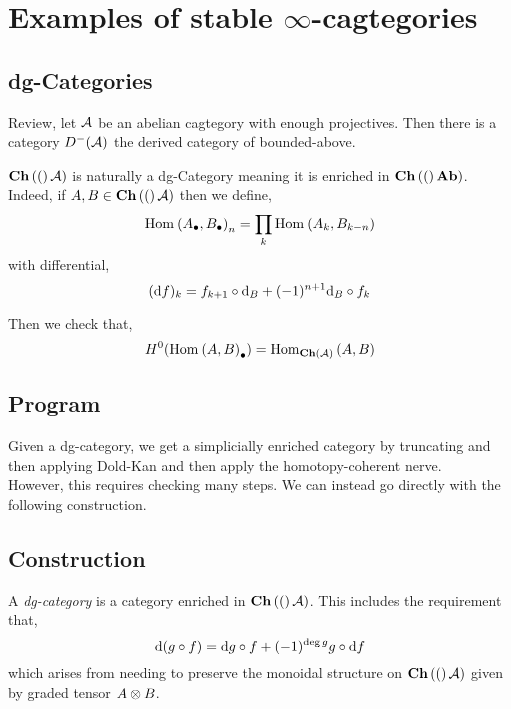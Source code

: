 \documentclass[12pt]{article}
\begin{document}
\section{Examples of stable $\infty$-cagtegories}

\subsection{dg-Categories}

\newcommand{\DK}{\mathrm{DK}}
\newcommand{\fin}{\mathrm{fin}}
\newcommand{\Fun}[3]{\mathrm{Fun}_{#1}\left(#2, #3\right)}
\newcommand{\Map}[3]{\mathrm{Map}_{#1}\left(#2, #3\right)}
\newcommand{\Mult}[3]{\mathrm{Mult}_{#1}\left(#2, #3\right)}
\newcommand{\Fin}{\mathrm{Fin}}
\newcommand{\Ob}{\mathrm{Ob}}
\renewcommand{\O}{\mathcal{O}}

Review, let $\mathcal{A}$ be an abelian cagtegory with enough projectives. Then there is a category $D^-(\mathcal{A})$ the derived category of bounded-above.


$\mathbf{Ch}\left( ( \right)\mathcal{A})$ is naturally a dg-Category meaning it is enriched in $\mathbf{Ch}\left( ( \right)\mathbf{Ab})$. Indeed, if $A, B \in \mathbf{Ch}\left( ( \right)\mathcal{A})$ then we define,
\[ \mathrm{Hom}_{} \left( A_\bullet, B_\bullet \right)_n = \prod_{k} \mathrm{Hom}_{} \left( A_k, B_{k-n} \right) \]
with differential,
\[ (\mathrm{d} f)_k = f_{k+1} \circ \mathrm{d}_B + (-1)^{n+1} \mathrm{d}_B \circ f_k \]

Then we check that,
\[ H^0(\mathrm{Hom}_{} \left( A, B \right)_\bullet) = \mathrm{Hom}_{\mathbf{Ch}\left( \mathcal{A} \right)} \left( A, B \right) \]

\subsection{Program}

Given a dg-category, we get a simplicially enriched category by truncating and then applying Dold-Kan and then apply the homotopy-coherent nerve. 
\bigskip\\
However, this requires checking many steps. We can instead go directly with the following construction. 

\subsection{Construction}

\newcommand{\dg}{\mathrm{dg}}

\begin{defn}
A \textit{dg-category} is a category enriched in $\mathbf{Ch}\left( ( \right)\mathcal{A})$. This includes the requirement that,
\[ \mathrm{d}{(g \circ f)} = \mathrm{d}{g} \circ f + (-1)^{\deg{g}} g \circ \mathrm{d}{f} \]
which arises from needing to preserve the monoidal structure on $\mathbf{Ch}\left( ( \right)\mathcal{A})$ given by graded tensor $A \otimes B$. 
\end{defn}
\end{document}
